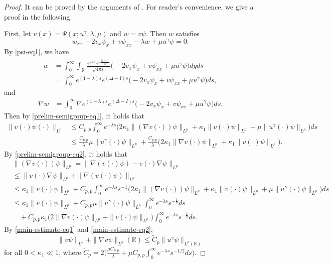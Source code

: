 \documentclass[11pt]{article} %
\theoremstyle{remark}
\theoremstyle{remark}
\numberwithin{equation}{section}
\numberwithin{figure}{section}
\numberwithin{table}{section}
\newcommand\RR{\ensuremath{\mathbb{R}}}
\begin{document}
\begin{proof}
It can be proved by the arguments of \cite[Proposition 3.1]{HaShZh2024}. For reader's  convenience, we give a proof in the following.

First, let   $v(x)=\Psi(x;u^\gamma,\lambda,\mu)$ and $w=v\psi$.  Then $w$ satisfies 
$$
w_{xx}-2v_x\psi_x+v\psi_{xx}-\lambda w+\mu u^\gamma \psi=0.
$$
By \eqref{psi-eq1}, we have
\begin{align*}
w&= \int_{0}^{\infty}\int_{\RR}\frac{e^{-\lambda  s}e^{-\frac{|y-x|^2}{4s}}}{\sqrt{4\pi s}} \big(  -2v_x\psi_x+v\psi_{xx}+\mu u^\gamma \psi\big) dyds\\
&=\int_0^\infty e^{(1-\lambda)s} e^{(\Delta -I)s}  \big(  -2v_x\psi_x+v\psi_{xx}+\mu u^\gamma \psi\big) 
ds,
\end{align*}
and 
\begin{align*}
\nabla w
&=\int_0^\infty \nabla e^{(1-\lambda)s} e^{(\Delta -I)s}  \big(  -2v_x\psi_x+v\psi_{xx}+\mu u^\gamma \psi\big) 
ds.
\end{align*}
Then by \eqref{prelim-semigroup-eq1}, it holds that
    \begin{align}
    \label{main-estimate-eq1}
    \|v(\cdot)\psi(\cdot)\|_{L^{p}}
    &\le C_{p,p}  \int_0^\infty e^{-\lambda s} \Big(2 \kappa_1\|(\nabla v (\cdot)) \psi\|_{L^p}+\kappa_1\|v(\cdot) \psi\|_{L^p}+\mu \|u^\gamma (\cdot)\psi\|_{L^p}\Big)ds\nonumber\\
    &\le \frac{C_{p,p}}{\lambda}  \mu \|u^\gamma (\cdot)\psi\|_{L^p}  + \frac{C_{p,p}}{\lambda}  \Big(2 \kappa_1 \|\nabla v (\cdot) \psi\|_{L^p}+\kappa_1
    \|v(\cdot) \psi\|_{L^p}\Big).
    \end{align}
   By \eqref{prelim-semigroup-eq2}, it holds that
    \begin{align}
    \label{main-estimate-eq2}
    &\|(\nabla v(\cdot)) \psi\|_{L^{p}}=\|\nabla (v(\cdot)\psi)-v(\cdot)\nabla \psi\|_{L^{p}}\nonumber\\
    &\le \|v(\cdot) \nabla \psi\|_{L^{p}}+\|\nabla (v(\cdot)\psi)\|_{L^{p}}\nonumber\\
    &\le \kappa_1\|v(\cdot)\psi\|_{L^{p}}+C_{p,p}\int_0^\infty e^{-\lambda s} s^{-\frac{1}{2}}\Big(2 \kappa_1\|(\nabla v (\cdot)) \psi\|_{L^p}+\kappa_1\|v(\cdot) \psi\|_{L^p}+\mu \|u^\gamma (\cdot)\psi\|_{L^p}\Big)ds\nonumber\\
    &\le \kappa_1{\|v(\cdot)\psi\|_{L^{p}}}+C_{p,p} \mu \|u^\gamma (\cdot)\psi\|_{L^p}\int_0^\infty e^{-\lambda s}s^{-\frac{1}{2}} ds\nonumber\\
    &\quad + C_{p,p}\kappa_1 \Big(2 \|\nabla v(\cdot)\psi\|_{L^p}+\|v(\cdot)\psi\|_{L^p}\Big) \int_0^\infty e^{-\lambda s}s^{-\frac{1}{2}} ds.
    \end{align}
By \eqref{main-estimate-eq1} and \eqref{main-estimate-eq2},  
$$
\|v\psi\|_{L^p}+\|\nabla v\psi\|_{L^p}(\RR)\le \tilde C_p \|u^\gamma \psi\|_{L^p(\RR)}
$$
for all $0<\kappa_1\ll 1$, where $\tilde C_p=2\Big(\frac{\mu C_{p,p}}{\lambda}+\mu C_{p,p}\int_0^\infty e^{-\lambda s} s^{-1/2} ds\Big)$.


\end{proof}
\end{document}

